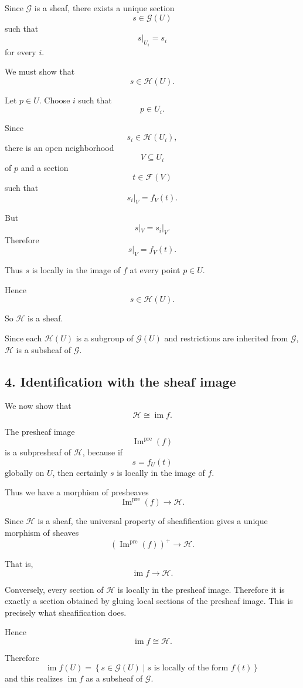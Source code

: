 \documentclass[12pt,a4paper]{article}
\begin{document}
Since $\mathcal G$ is a sheaf, there exists a unique section
\[
s \in \mathcal G(U)
\]
such that
\[
s|_{U_i}=s_i
\]
for every $i$.

We must show that
\[
s \in \mathcal H(U).
\]

Let $p \in U$.
Choose $i$ such that
\[
p \in U_i.
\]

Since
\[
s_i \in \mathcal H(U_i),
\]
there is an open neighborhood
\[
V \subseteq U_i
\]
of $p$ and a section
\[
t \in \mathcal F(V)
\]
such that
\[
s_i|_V = f_V(t).
\]

But
\[
s|_V = s_i|_V.
\]
Therefore
\[
s|_V = f_V(t).
\]

Thus $s$ is locally in the image of $f$ at every point $p \in U$.

Hence
\[
s \in \mathcal H(U).
\]

So $\mathcal H$ is a sheaf.

Since each $\mathcal H(U)$ is a subgroup of $\mathcal G(U)$ and restrictions
are inherited from $\mathcal G$, $\mathcal H$ is a subsheaf of $\mathcal G$.

\subsection*{4. Identification with the sheaf image}

We now show that
\[
\mathcal H \cong \operatorname{im} f.
\]

The presheaf image
\[
\operatorname{Im}^{\operatorname{pre}}(f)
\]
is a subpresheaf of $\mathcal H$, because if
\[
s = f_U(t)
\]
globally on $U$, then certainly $s$ is locally in the image of $f$.

Thus we have a morphism of presheaves
\[
\operatorname{Im}^{\operatorname{pre}}(f)
\longrightarrow
\mathcal H.
\]

Since $\mathcal H$ is a sheaf, the universal property of sheafification gives
a unique morphism of sheaves
\[
\left(\operatorname{Im}^{\operatorname{pre}}(f)\right)^+
\longrightarrow
\mathcal H.
\]

That is,
\[
\operatorname{im} f \longrightarrow \mathcal H.
\]

Conversely, every section of $\mathcal H$ is locally in the presheaf image.
Therefore it is exactly a section obtained by gluing local sections of the
presheaf image. This is precisely what sheafification does.

Hence
\[
\operatorname{im} f \cong \mathcal H.
\]

Therefore
\[
\boxed{
	\operatorname{im} f(U)
	=
	\left\{
	s \in \mathcal G(U)
	\mid
	s \text{ is locally of the form } f(t)
	\right\}
}
\]
and this realizes $\operatorname{im} f$ as a subsheaf of $\mathcal G$.
\end{document}

